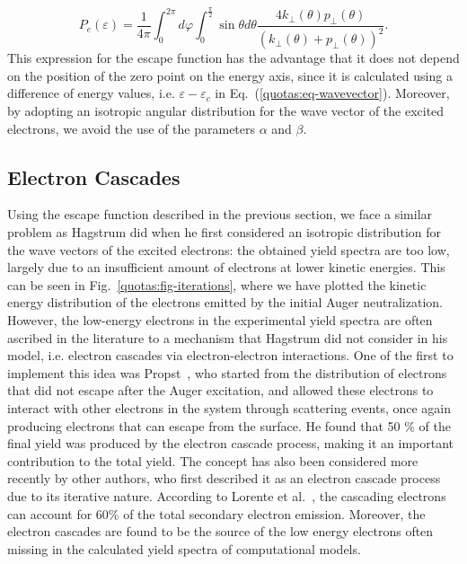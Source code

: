 \begin{refsection}
\begin{equation}
P_e(\varepsilon) = \frac{1}{4\pi} \int_{0}^{2\pi} d\varphi \int_0^{\frac{\pi}{2}} \sin{\theta} d\theta\frac{4k_\perp (\theta) p_\perp (\theta)}{(k_\perp (\theta) + p_\perp(\theta))^2}.
\end{equation}
This expression for the escape function has the advantage that it does not depend on the position of the zero point on the energy axis, since it is calculated using a difference of energy values, i.e. $\varepsilon - \varepsilon_c$ in Eq.~(\ref{quotas:eq-wavevector}). Moreover, by adopting an isotropic angular distribution for the wave vector of the excited electrons, we avoid the use of the parameters $\alpha$ and $\beta$.

\subsection{Electron Cascades} \label{quotas:sec-cascades}

Using the escape function described in the previous section, we face a similar problem as Hagstrum did when he first considered an isotropic distribution for the wave vectors of the excited electrons: the obtained yield spectra are too low, largely due to an insufficient amount of electrons at lower kinetic energies. This can be seen in Fig.~\ref{quotas:fig-iterations}, where we have plotted the kinetic energy distribution of the electrons emitted by the initial Auger neutralization. However, the low-energy electrons in the experimental yield spectra are often ascribed in the literature to a mechanism that Hagstrum did not consider in his model, i.e. electron cascades via electron-electron interactions. One of the first to implement this idea was  Propst~\cite{Propst1963}, who started from the distribution of electrons that did not escape after the Auger excitation, and allowed these electrons to interact with other electrons in the system through scattering events, once again producing electrons that can escape from the surface. He found that 50 \% of the final yield was produced by the electron cascade process, making it an important contribution to the total yield. The concept has also been considered more recently by other authors, who first described it as an electron cascade process due to its iterative nature. According to Lorente et al.~\cite{Lorente1995}, the cascading electrons can account for 60\% of the total secondary electron emission. Moreover, the electron cascades are found to be the source of the low energy electrons often missing in the calculated yield spectra of computational models.\\


\end{refsection}
